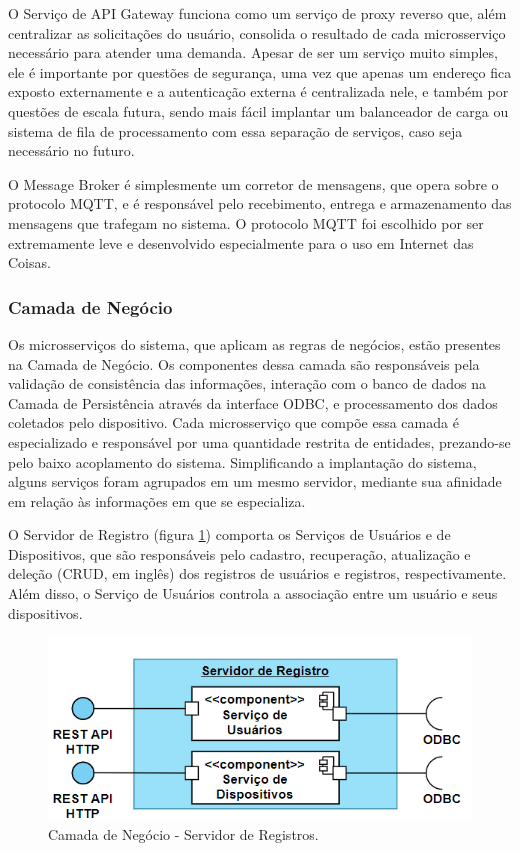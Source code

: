O Serviço de API Gateway funciona como um serviço de proxy reverso que, além centralizar as solicitações do usuário, consolida o resultado de cada microsserviço necessário para atender uma demanda. Apesar de ser um serviço muito simples, ele é importante por questões de segurança, uma vez que apenas um endereço fica exposto externamente e a autenticação externa é centralizada nele, e também por questões de escala futura, sendo mais fácil implantar um balanceador de carga ou sistema de fila de processamento com essa separação de serviços, caso seja necessário no futuro.

O Message Broker é simplesmente um corretor de mensagens, que opera sobre o protocolo MQTT, e é responsável pelo recebimento, entrega e armazenamento das mensagens que trafegam no sistema. O protocolo MQTT foi escolhido por ser extremamente leve e desenvolvido especialmente para o uso em Internet das Coisas.
    
\subsubsection{Camada de Negócio}

Os microsserviços do sistema, que aplicam as regras de negócios, estão presentes na Camada de Negócio. Os componentes dessa camada são responsáveis pela validação de consistência das informações, interação com o banco de dados na Camada de Persistência através da interface ODBC, e processamento dos dados coletados pelo dispositivo. Cada microsserviço que compõe essa camada é especializado e responsável por uma quantidade restrita de entidades, prezando-se pelo baixo acoplamento do sistema. Simplificando a implantação do sistema, alguns serviços foram agrupados em um mesmo servidor, mediante sua afinidade em relação às informações em que se especializa.

O Servidor de Registro (figura \ref{fig:camada_negocios_registro}) comporta os Serviços de Usuários e de Dispositivos, que são responsáveis pelo cadastro, recuperação, atualização e deleção  (CRUD, em inglês) dos registros de usuários e registros, respectivamente. Além disso, o Serviço de Usuários controla a associação entre um usuário e seus dispositivos.

\begin{figure}[H]
    \centering
    \includegraphics[scale=0.50]{figuras/projeto/software/camada_negocios_registro.PNG}
    \caption{Camada de Negócio - Servidor de Registros.}
    \label{fig:camada_negocios_registro}
\end{figure}

